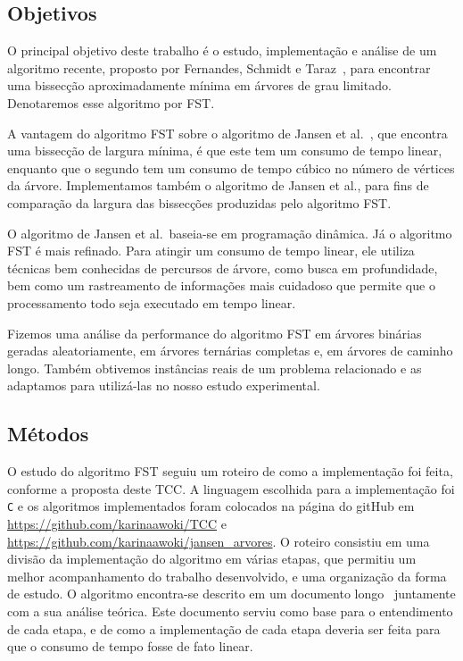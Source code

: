 \subsection{Objetivos} 

O principal objetivo deste trabalho é o estudo, implementação e 
análise de um algoritmo recente, proposto por Fernandes, Schmidt e 
Taraz~\cite{FernandesST13}, para encontrar uma bissecção 
aproximadamente mínima em árvores de grau limitado. Denotaremos
esse algoritmo por FST. 

A vantagem do algoritmo FST sobre o algoritmo de Jansen et 
al.~\cite{JansenKLS01}, que encontra uma bissecção de largura 
mínima, é que este tem um consumo de tempo linear, enquanto que o 
segundo tem um consumo de tempo cúbico no número de vértices da 
árvore. 
Implementamos também o algoritmo de Jansen et al., para fins de 
comparação da largura das bissecções produzidas pelo algoritmo
FST. 

O algoritmo de Jansen et al.\ baseia-se em 
programação dinâmica. 
Já o algoritmo FST é mais refinado. 
Para atingir um consumo de tempo 
linear, ele utiliza técnicas bem conhecidas de percursos de árvore, 
como busca em profundidade, bem como um rastreamento de 
informações mais cuidadoso que permite que o processamento todo 
seja executado em tempo linear. 

Fizemos uma análise 
da performance do algoritmo FST em árvores binárias geradas 
aleatoriamente,
em árvores ternárias completas e,
em árvores de caminho longo.
Também obtivemos instâncias reais de um problema relacionado e as
adaptamos para 
utilizá-las no nosso estudo experimental.
 

\bigskip
\bigskip


\subsection{Métodos}

O estudo do algoritmo FST seguiu um roteiro de
como a implementação foi feita, conforme a proposta deste TCC. 
A linguagem escolhida para a implementação foi \texttt{C} e os 
algoritmos implementados foram colocados na página do gitHub
em \url{https://github.com/karinaawoki/TCC} e
\url{https://github.com/karinaawoki/jansen_arvores}. 
O roteiro consistiu em uma divisão da implementação do algoritmo 
em várias etapas, que permitiu um melhor acompanhamento do 
trabalho desenvolvido, e uma organização da forma de estudo. 
O algoritmo encontra-se descrito em um documento 
longo~\cite{Schmidt15} juntamente com a sua análise teórica. 
Este documento serviu como base para o entendimento de cada 
etapa, e de como a implementação de cada etapa deveria ser feita 
para que o consumo de tempo fosse de fato linear. 

